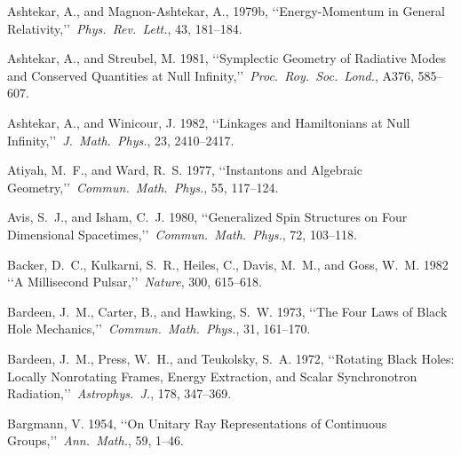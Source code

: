 \item Ashtekar, A., and Magnon-Ashtekar, A., 1979b, \lq\lq Energy-Momentum in General Relativity,\rq\rq\ \emph{Phys.\ Rev.\ Lett.}, 43, 181--184.
\item Ashtekar, A., and Streubel, M. 1981, \lq\lq Symplectic Geometry of Radiative Modes and Conserved Quantities at Null Infinity,\rq\rq\ \emph{Proc.\ Roy.\ Soc.\ Lond.}, A376, 585--607.
\item Ashtekar, A., and Winicour, J. 1982, \lq\lq Linkages and Hamiltonians at Null Infinity,\rq\rq\ \emph{J.\ Math.\ Phys.}, 23, 2410--2417.
\item Atiyah, M.~F., and Ward, R.~S. 1977, \lq\lq Instantons and Algebraic Geometry,\rq\rq\ \emph{Commun.\ Math.\ Phys.}, 55, 117--124.
\item Avis, S.~J., and Isham, C.~J. 1980, \lq\lq Generalized Spin Structures on Four Dimensional Spacetimes,\rq\rq\ \emph{Commun.\ Math.\ Phys.}, 72, 103--118.
\item Backer, D.~C., Kulkarni, S.~R., Heiles, C., Davis, M.~M., and Goss, W.~M. 1982 \lq\lq A Millisecond Pulsar,\rq\rq\ \emph{Nature}, 300, 615--618.
\item Bardeen, J.~M., Carter, B., and Hawking, S.~W. 1973, \lq\lq The Four Laws of Black Hole Mechanics,\rq\rq\ \emph{Commun.\ Math.\ Phys.}, 31, 161--170.
\item Bardeen, J.~M., Press, W.~H., and Teukolsky, S.~A. 1972, \lq\lq Rotating Black Holes: Locally Nonrotating Frames, Energy Extraction, and Scalar Synchronotron Radiation,\rq\rq\ \emph{Astrophys.\ J.}, 178, 347--369.
\item Bargmann, V. 1954, \lq\lq On Unitary Ray Representations of Continuous Groups,\rq\rq\ \emph{Ann.\ Math.}, 59, 1--46.

